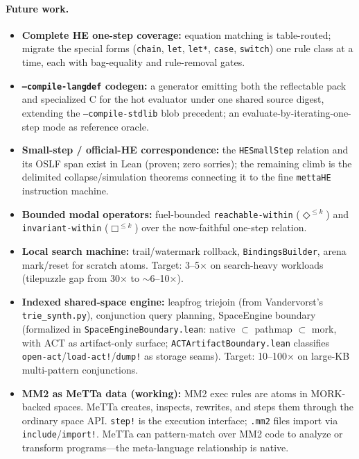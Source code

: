 \documentclass[11pt]{article}
\newcommand{\code}[1]{\texttt{#1}}
\begin{document}
\paragraph{Future work.}
\begin{itemize}
\item \textbf{Complete HE one-step coverage:} equation matching is
  table-routed; migrate the special forms (\code{chain}, \code{let},
  \code{let*}, \code{case}, \code{switch}) one rule class at a time,
  each with bag-equality and rule-removal gates.
\item \textbf{\code{--compile-langdef} codegen:} a generator emitting
  both the reflectable pack and specialized C for the hot evaluator
  under one shared source digest, extending the
  \code{--compile-stdlib} blob precedent; an
  evaluate-by-iterating-one-step mode as reference oracle.
\item \textbf{Small-step / official-HE correspondence:} the
  \code{HESmallStep} relation and its OSLF span exist in Lean
  (proven; zero sorries); the remaining climb is the delimited
  collapse/simulation theorems connecting it to the fine
  \code{mettaHE} instruction machine.
\item \textbf{Bounded modal operators:} fuel-bounded
  \code{reachable-within} ($\Diamond^{\le k}$) and
  \code{invariant-within} ($\Box^{\le k}$) over the now-faithful
  one-step relation.
\item \textbf{Local search machine:} trail/watermark rollback,
  \code{BindingsBuilder}, arena mark/reset for scratch atoms.
  Target: 3--5$\times$ on search-heavy workloads (tilepuzzle gap
  from 30$\times$ to $\sim$6--10$\times$).
\item \textbf{Indexed shared-space engine:} leapfrog triejoin
  (from Vandervorst's \code{trie\_synth.py}), conjunction query
  planning, SpaceEngine boundary (formalized in
  \code{SpaceEngineBoundary.lean}: native $\subset$ pathmap $\subset$ mork,
  with ACT as artifact-only surface; \code{ACTArtifactBoundary.lean}
  classifies \code{open-act}/\code{load-act!}/\code{dump!} as storage seams).
  Target: 10--100$\times$ on large-KB multi-pattern conjunctions.
\item \textbf{MM2 as MeTTa data (working):} MM2 exec rules are atoms in
  MORK-backed spaces.  MeTTa creates, inspects, rewrites, and steps them
  through the ordinary space API\@.  \code{step!} is the execution interface;
  \code{.mm2} files import via \code{include}/\code{import!}.  MeTTa can
  pattern-match over MM2 code to analyze or transform programs---the
  meta-language relationship is native.

\end{itemize}
\end{document}
